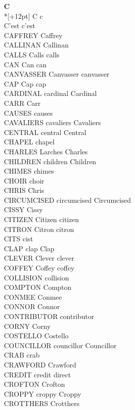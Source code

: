 \vspace{14pt}
\noindent\textbf{\Large C}\\*[+12pt]
C c\\
C'est c'est\\
CAFFREY Caffrey\\
CALLINAN Callinan\\
CALLS Calls calls\\
CAN Can can\\
CANVASSER Canvasser canvasser\\
CAP Cap cap\\
CARDINAL cardinal Cardinal\\
CARR Carr\\
CAUSES causes\\
CAVALIERS cavaliers Cavaliers\\
CENTRAL central Central\\
CHAPEL chapel\\
CHARLES Larches Charles\\
CHILDREN children Children\\
CHIMES chimes\\
CHOIR choir\\
CHRIS Chris\\
CIRCUMCISED circumcised Circumcised\\
CISSY Cissy\\
CITIZEN Citizen citizen\\
CITRON Citron citron\\
CITS cist\\
CLAP clap Clap\\
CLEVER Clever clever\\
COFFEY Coffey coffey\\
COLLISION collision\\
COMPTON Compton\\
CONMEE Conmee\\
CONNOR Connor\\
CONTRIBUTOR contributor\\
CORNY Corny\\
COSTELLO Costello\\
COUNCILLOR councillor Councillor\\
CRAB crab\\
CRAWFORD Crawford\\
CREDIT credit direct\\
CROFTON Crofton\\
CROPPY croppy Croppy\\
CROTTHERS Crotthers\\
